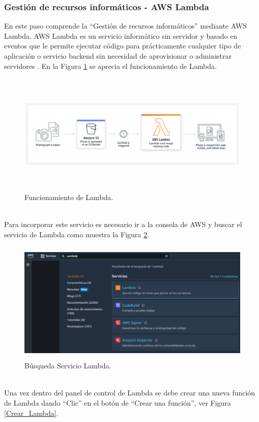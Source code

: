 \documentclass[a4paper,10pt, oneside, titlepage]{article}
\begin{document}
	\subsubsection{Gestión de recursos informáticos - AWS Lambda}\label{AWS_Lambda}
	En este paso comprende la ``Gestión de recursos informáticos'' mediante AWS Lambda. AWS Lambda es un servicio informático sin servidor y basado en eventos que le permite ejecutar código para prácticamente cualquier tipo de aplicación o servicio backend sin necesidad de aprovisionar o administrar servidores \cite{Lambda}. En la Figura \ref{Funcionamiento_Lambda} se aprecia el funcionamiento de Lambda.
	\begin{figure}[!h]
		\centering
		\includegraphics[width = 1\linewidth, height = 5.8cm]{Funcionamiento_Lambda.png}
		\caption{Funcionamiento de Lambda.}
		\label{Funcionamiento_Lambda}
	\end{figure} \\
	\indent Para incorporar este servicio es necesario ir a la consola de AWS y buscar el servicio de Lambda como muestra la Figura \ref{Servicio_Lambda}.
	\begin{figure}[!h]
		\centering
		\includegraphics[width = 1\linewidth, height = 5.8cm]{Servicio_Lambda.png}
		\caption{Búsqueda Servicio Lambda.}
		\label{Servicio_Lambda}
	\end{figure} \\
	\indent Una vez dentro del panel de control de Lambda se debe crear una nueva función de Lambda dando ``Clic'' en el botón de ``Crear una función'', ver Figura \ref{Crear_Lambda}.
\end{document}
